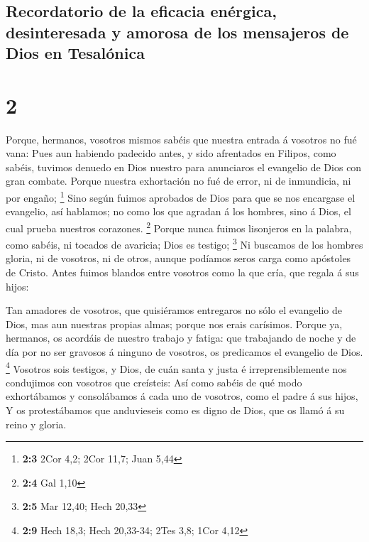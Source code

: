 \hypertarget{recordatorio-de-la-eficacia-enuxe9rgica-desinteresada-y-amorosa-de-los-mensajeros-de-dios-en-tesaluxf3nica}{%
\subsection{Recordatorio de la eficacia enérgica, desinteresada y
amorosa de los mensajeros de Dios en
Tesalónica}\label{recordatorio-de-la-eficacia-enuxe9rgica-desinteresada-y-amorosa-de-los-mensajeros-de-dios-en-tesaluxf3nica}}

\hypertarget{section-1}{%
\section{2}\label{section-1}}

 Porque, hermanos, vosotros mismos sabéis que nuestra
entrada á vosotros no fué vana:  Pues aun habiendo padecido
antes, y sido afrentados en Filipos, como sabéis, tuvimos denuedo en
Dios nuestro para anunciaros el evangelio de Dios con gran combate.
 Porque nuestra exhortación no fué de error, ni de
inmundicia, ni por engaño; \footnote{\textbf{2:3} 2Cor 4,2; 2Cor 11,7;
  Juan 5,44}  Sino según fuimos aprobados de Dios para que
se nos encargase el evangelio, así hablamos; no como los que agradan á
los hombres, sino á Dios, el cual prueba nuestros corazones. \footnote{\textbf{2:4}
  Gal 1,10}  Porque nunca fuimos lisonjeros en la palabra,
como sabéis, ni tocados de avaricia; Dios es testigo; \footnote{\textbf{2:5}
  Mar 12,40; Hech 20,33}  Ni buscamos de los hombres gloria,
ni de vosotros, ni de otros, aunque podíamos seros carga como apóstoles
de Cristo.  Antes fuimos blandos entre vosotros como la que
cría, que regala á sus hijos:

 Tan amadores de vosotros, que quisiéramos entregaros no
sólo el evangelio de Dios, mas aun nuestras propias almas; porque nos
erais carísimos.  Porque ya, hermanos, os acordáis de
nuestro trabajo y fatiga: que trabajando de noche y de día por no ser
gravosos á ninguno de vosotros, os predicamos el evangelio de Dios.
\footnote{\textbf{2:9} Hech 18,3; Hech 20,33-34; 2Tes 3,8; 1Cor 4,12}
 Vosotros sois testigos, y Dios, de cuán santa y justa é
irreprensiblemente nos condujimos con vosotros que creísteis:
 Así como sabéis de qué modo exhortábamos y consolábamos á
cada uno de vosotros, como el padre á sus hijos,  Y os
protestábamos que anduvieseis como es digno de Dios, que os llamó á su
reino y gloria.

